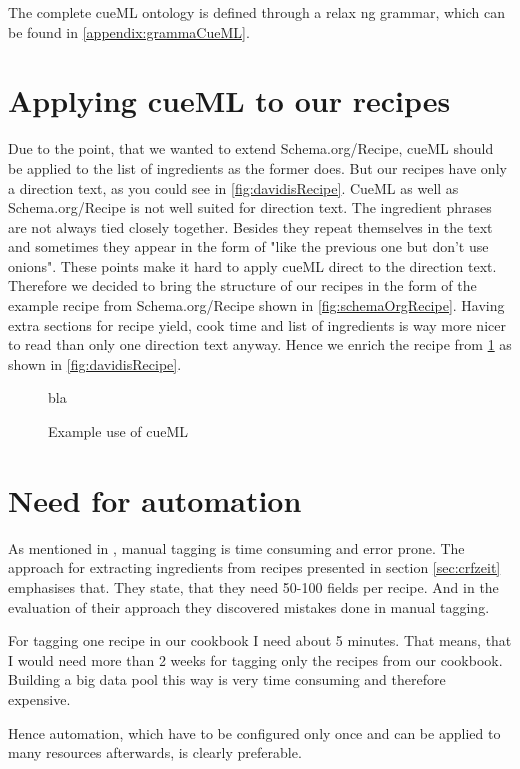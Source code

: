 \documentclass[12pt, twoside]{report}
\begin{document}
The complete cueML ontology is defined through a relax ng grammar, which can be found in \cref{appendix:grammaCueML}. 


\section{Applying cueML to our recipes}
Due to the point, that we wanted to extend Schema.org/Recipe, cueML should be applied to the list of ingredients as the former does. But our recipes have only a direction text, as you could see in \cref{fig:davidisRecipe}. CueML as well as Schema.org/Recipe is not well suited for direction text. The ingredient phrases are not always tied closely together. Besides they repeat themselves in the text and sometimes they appear in the form of "like the previous one but don't use onions". These points make it hard to apply cueML direct to the direction text. Therefore we decided to bring the structure of our recipes in the form of the example recipe from Schema.org/Recipe shown in \cref{fig:schemaOrgRecipe}. Having extra sections for recipe yield, cook time and list of ingredients is way more nicer to read than only one direction text anyway. Hence we enrich the recipe from \cref{fig:exampleCueMLDavidis} as shown in \cref{fig:davidisRecipe}.

\begin{figure}[H]
	\centering
	bla
	\caption{Example use of cueML}
	\label{fig:exampleCueMLDavidis}
\end{figure} 

\section{Need for automation}
As mentioned in \parencite{manualTagging}, manual tagging is time consuming and error prone. The approach for extracting ingredients from recipes presented in section \ref{sec:crfzeit} emphasises that. They state, that they need 50-100 fields per recipe. And in the evaluation of their approach they discovered mistakes done in manual tagging.

For tagging one recipe in our cookbook I need about 5 minutes. That means, that I would need more than 2 weeks for tagging only the recipes from our cookbook. Building a big data pool this way is very time consuming and therefore expensive.

Hence automation, which have to be configured only once and can be applied to many resources afterwards, is clearly preferable.
\end{document}
